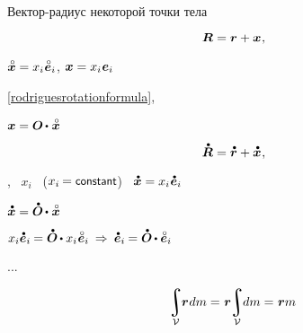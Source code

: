 \foreignlanguage{russian}{Вектор\hbox{-}радиус некоторой точки тела}

\begin{equation*}
\bm{R} = \bm{r} + \bm{x}
\hspace{.1ex} ,
\end{equation*}

${\mathcircabove{\bm{x}} = x_i \hspace{.1ex} \mathcircabove{\bm{e}}_i}$,
${\bm{x} = x_i \hspace{.1ex} \bm{e}_i}$

\eqref{rodriguesrotationformula}, 

${\bm{x} = \rotationtensor \hspace{-0.15ex} \dotp \hspace{.1ex} \mathcircabove{\bm{x}}}$

\begin{equation*}
\mathdotabove{\bm{R}} = \mathdotabove{\bm{r}} + \mathdotabove{\bm{x}}
\hspace{.1ex} ,
\end{equation*}

, ~${x_i}$ ~(${x_i \hspace{-0.16ex} = \constant}$) ~${\mathdotabove{\bm{x}} = x_i \hspace{.1ex} \mathdotabove{\bm{e}}_i}$

${\mathdotabove{\bm{x}} = \mathdotabove{\rotationtensor} \hspace{-0.15ex} \dotp \hspace{.1ex} \mathcircabove{\bm{x}}}$

${x_i \mathdotabove{\bm{e}}_i \hspace{-0.12ex} = \mathdotabove{\rotationtensor} \hspace{-0.15ex} \dotp x_i \hspace{.1ex} \mathcircabove{\bm{e}}_i
\:\Rightarrow\:
\mathdotabove{\bm{e}}_i \hspace{-0.12ex} = \mathdotabove{\rotationtensor} \hspace{-0.15ex} \dotp \mathcircabove{\bm{e}}_i}$

...

\[
\hspace{-0.4ex} \integral_{\mathcal{V}} \hspace{-0.6ex} \bm{r} \hspace{.1ex} dm = \hspace{.1ex} \bm{r} \hspace{-0.5ex} \integral_{\mathcal{V}} \hspace{-0.6ex} dm = \hspace{.1ex} \bm{r} m
\]

